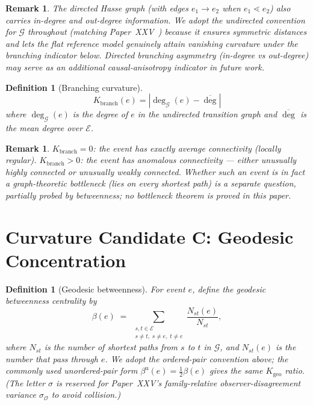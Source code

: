 \documentclass[12pt]{article}
\newtheorem{definition}[theorem]{Definition}
\newtheorem{remark}[theorem]{Remark}
\newcommand{\Ecal}{\mathcal{E}}
\newcommand{\Gcal}{\mathcal{G}}
\newcommand{\Ocal}{\mathcal{O}}
\begin{document}
\begin{remark}
The directed Hasse graph (with edges $e_1 \to e_2$ when $e_1 \lessdot e_2$) also carries in-degree and out-degree information. We adopt the \emph{undirected} convention for $\Gcal$ throughout (matching Paper~XXV~\citep{SmartXXV}) because it ensures symmetric distances and lets the flat reference model genuinely attain vanishing curvature under the branching indicator below. Directed branching asymmetry (in-degree vs out-degree) may serve as an additional causal-anisotropy indicator in future work.
\end{remark}

\begin{definition}[Branching curvature]\label{def:Kbranch}
\begin{equation}\label{eq:Kbranch}
    K_{\mathrm{branch}}(e) = \left|\deg_{\Gcal}(e) - \overline{\deg}\right|
\end{equation}
where $\deg_{\Gcal}(e)$ is the degree of $e$ in the undirected transition graph and $\overline{\deg}$ is the mean degree over $\Ecal$.
\end{definition}

\begin{remark}
$K_{\mathrm{branch}} = 0$: the event has exactly average connectivity (locally regular). $K_{\mathrm{branch}} > 0$: the event has anomalous connectivity --- either unusually highly connected or unusually weakly connected. Whether such an event is in fact a graph-theoretic bottleneck (lies on every shortest path) is a separate question, partially probed by betweenness; no bottleneck theorem is proved in this paper.
\end{remark}

\section{Curvature Candidate C: Geodesic Concentration}\label{sec:curv_C}

\begin{definition}[Geodesic betweenness]\label{def:between}
For event $e$, define the geodesic betweenness centrality by
\begin{equation}\label{eq:between}
    \beta(e) \;=\; \sum_{\substack{s,t \in \Ecal \\ s \neq t,\; s \neq e,\; t \neq e}} \frac{N_{st}(e)}{N_{st}},
\end{equation}
where $N_{st}$ is the number of shortest paths from $s$ to $t$ in $\Gcal$, and $N_{st}(e)$ is the number that pass through $e$. We adopt the ordered-pair convention above; the commonly used unordered-pair form $\beta^{\mathrm{u}}(e) = \tfrac{1}{2}\beta(e)$ gives the same $K_{\mathrm{geo}}$ ratio. (The letter $\sigma$ is reserved for Paper~XXV's family-relative observer-disagreement variance $\sigma_{\Ocal}$ to avoid collision.)
\end{definition}
\end{document}
